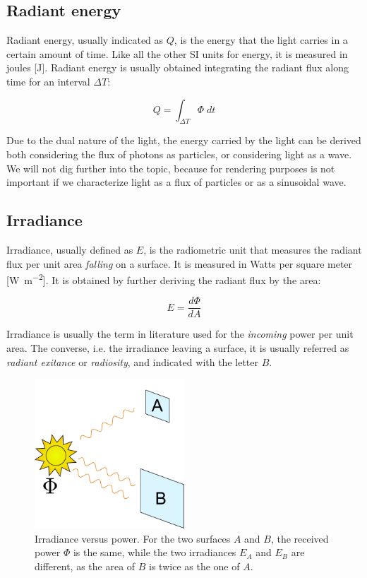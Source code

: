 \subsection{Radiant energy}
Radiant energy, usually indicated as $Q$, is the energy that the light carries in a certain amount of time. Like all the other SI units for energy, it is measured in joules [\si{\joule}]. Radiant energy is usually obtained integrating the radiant flux along time for an interval $\Delta T$:

$$
Q = \int_{\Delta T} \Phi \; dt
$$

Due to the dual nature of the light, the energy carried by the light can be derived both considering the flux of photons as particles, or considering light as a wave. We will not dig further into the topic, because for rendering purposes is not important if we characterize light as a flux of particles or as a sinusoidal wave.

\subsection{Irradiance}

Irradiance, usually defined as $E$, is the radiometric unit that measures the radiant flux per unit area \emph{falling} on a surface. It is measured in Watts per square meter [\si{\watt\per\square\meter}]. It is obtained by further deriving the radiant flux by the area:

$$
E = \frac{d\Phi}{dA}
$$

Irradiance is usually the term in literature used for the \emph{incoming} power per unit area. The converse, i.e. the irradiance leaving a surface, it is usually referred as \emph{radiant exitance} or \emph{radiosity}, and indicated with the letter $B$.

\begin{figure}[!ht]
\centering
\includegraphics[width=0.5\textwidth]{images/irradiance.pdf}
\caption{Irradiance versus power. For the two surfaces $A$ and $B$, the received power $\Phi$ is the same, while the two irradiances $E_A$ and $E_B$ are different, as the area of $B$ is twice as the one of $A$.}
\label{fig:irradiance}
\end{figure}
 

